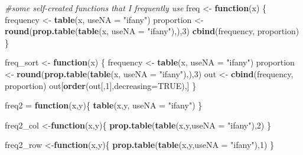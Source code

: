 \documentclass[
]{article}
\newenvironment{Shaded}{\begin{snugshade}}{\end{snugshade}}
\newcommand{\AttributeTok}[1]{\textcolor[rgb]{0.13,0.29,0.53}{#1}}
\newcommand{\CommentTok}[1]{\textcolor[rgb]{0.56,0.35,0.01}{\textit{#1}}}
\newcommand{\ConstantTok}[1]{\textcolor[rgb]{0.56,0.35,0.01}{#1}}
\newcommand{\ControlFlowTok}[1]{\textcolor[rgb]{0.13,0.29,0.53}{\textbf{#1}}}
\newcommand{\DecValTok}[1]{\textcolor[rgb]{0.00,0.00,0.81}{#1}}
\newcommand{\FunctionTok}[1]{\textcolor[rgb]{0.13,0.29,0.53}{\textbf{#1}}}
\newcommand{\NormalTok}[1]{#1}
\newcommand{\OtherTok}[1]{\textcolor[rgb]{0.56,0.35,0.01}{#1}}
\newcommand{\StringTok}[1]{\textcolor[rgb]{0.31,0.60,0.02}{#1}}
\begin{document}
\begin{Shaded}
\begin{Highlighting}[]
\CommentTok{\#some self{-}created functions that I frequently use}
\NormalTok{freq }\OtherTok{\textless{}{-}} \ControlFlowTok{function}\NormalTok{(x) \{}
\NormalTok{frequency }\OtherTok{\textless{}{-}} \FunctionTok{table}\NormalTok{(x, }\AttributeTok{useNA =} \StringTok{"ifany"}\NormalTok{)}
\NormalTok{proportion }\OtherTok{\textless{}{-}} \FunctionTok{round}\NormalTok{(}\FunctionTok{prop.table}\NormalTok{(}\FunctionTok{table}\NormalTok{(x, }\AttributeTok{useNA =} \StringTok{"ifany"}\NormalTok{),),}\DecValTok{3}\NormalTok{)}
\FunctionTok{cbind}\NormalTok{(frequency, proportion)}
\NormalTok{\}}

\NormalTok{freq\_sort }\OtherTok{\textless{}{-}} \ControlFlowTok{function}\NormalTok{(x) \{}
\NormalTok{frequency }\OtherTok{\textless{}{-}} \FunctionTok{table}\NormalTok{(x, }\AttributeTok{useNA =} \StringTok{"ifany"}\NormalTok{)}
\NormalTok{proportion }\OtherTok{\textless{}{-}} \FunctionTok{round}\NormalTok{(}\FunctionTok{prop.table}\NormalTok{(}\FunctionTok{table}\NormalTok{(x, }\AttributeTok{useNA =} \StringTok{"ifany"}\NormalTok{),),}\DecValTok{3}\NormalTok{)}
\NormalTok{out }\OtherTok{\textless{}{-}} \FunctionTok{cbind}\NormalTok{(frequency, proportion)}
\NormalTok{out[}\FunctionTok{order}\NormalTok{(out[,}\DecValTok{1}\NormalTok{],}\AttributeTok{decreasing=}\ConstantTok{TRUE}\NormalTok{),]}
\NormalTok{\}}

\NormalTok{freq2 }\OtherTok{=} \ControlFlowTok{function}\NormalTok{(x,y)\{}
\FunctionTok{table}\NormalTok{(x,y, }\AttributeTok{useNA =} \StringTok{"ifany"}\NormalTok{)}
\NormalTok{\}}

\NormalTok{freq2\_col }\OtherTok{\textless{}{-}}\ControlFlowTok{function}\NormalTok{(x,y)\{}
\FunctionTok{prop.table}\NormalTok{(}\FunctionTok{table}\NormalTok{(x,y,}\AttributeTok{useNA =} \StringTok{"ifany"}\NormalTok{),}\DecValTok{2}\NormalTok{)}
\NormalTok{\}}

\NormalTok{freq2\_row }\OtherTok{\textless{}{-}}\ControlFlowTok{function}\NormalTok{(x,y)\{}
\FunctionTok{prop.table}\NormalTok{(}\FunctionTok{table}\NormalTok{(x,y,}\AttributeTok{useNA =} \StringTok{"ifany"}\NormalTok{),}\DecValTok{1}\NormalTok{)}
\NormalTok{\}}


\end{Highlighting}
\end{Shaded}
\end{document}
